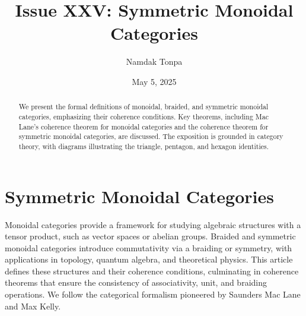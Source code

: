 \documentclass{article}
\begin{document}
\title{Issue XXV: Symmetric Monoidal Categories}
\author{Namdak Tonpa}
\date{May 5, 2025}

\maketitle

\begin{abstract}
We present the formal definitions of monoidal, braided, and symmetric
monoidal categories, emphasizing their coherence conditions. Key theorems,
including Mac Lane's coherence theorem for monoidal categories and the
coherence theorem for symmetric monoidal categories, are discussed.
The exposition is grounded in category theory, with diagrams illustrating
the triangle, pentagon, and hexagon identities.
\end{abstract}

\ifincludeTOC
  \tableofcontents
\fi

\section{Symmetric Monoidal Categories}

Monoidal categories provide a framework for studying algebraic structures with a tensor product,
such as vector spaces or abelian groups. Braided and symmetric monoidal categories introduce
commutativity via a braiding or symmetry, with applications in topology, quantum algebra,
and theoretical physics. This article defines these structures and their coherence conditions,
culminating in coherence theorems that ensure the consistency of associativity, unit,
and braiding operations. We follow the categorical formalism pioneered by
Saunders Mac Lane and Max Kelly.
\end{document}
